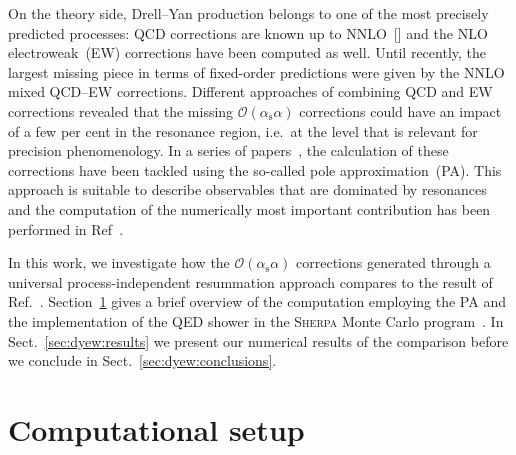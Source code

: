 \documentclass[11pt]{cernrep}
\newcommand{\order}{\ensuremath{\mathcal{O}}}
\newcommand{\alphas}{\ensuremath{\alpha_\mathrm{s}}}
\begin{document}
On the theory side, Drell--Yan production belongs to one of the most precisely predicted processes:
QCD corrections are known up to NNLO~[] and the NLO electroweak~(EW) corrections have been computed as well.
Until recently, the largest missing piece in terms of fixed-order predictions were given by the NNLO mixed QCD--EW corrections.
Different approaches of combining QCD and EW corrections revealed that the missing $\order(\alphas\alpha)$ corrections could have an impact of a few per cent in the resonance region, i.e.\ at the level that is relevant for precision phenomenology.
In a series of papers~\cite{Dittmaier:2014qza,Dittmaier:2015rxo}, the calculation of these corrections have been tackled using the so-called pole approximation~(PA).
This approach is suitable to describe observables that are dominated by resonances
and the computation of the numerically most important contribution has been performed in Ref~\cite{Dittmaier:2015rxo}.

In this work, we investigate how the $\order(\alphas\alpha)$ corrections 
generated through a universal process-independent resummation approach 
compares to the result of Ref.~\cite{Dittmaier:2015rxo}.
Section~\ref{sec:dyew:comp} gives a brief overview of the computation 
employing the PA and the implementation of the QED shower in the 
\textsc{Sherpa} Monte Carlo program~\cite{Gleisberg:2008ta}.
In Sect.~\ref{sec:dyew:results} we present our numerical results of the 
comparison before we conclude in Sect.~\ref{sec:dyew:conclusions}.


\section{Computational setup}
\label{sec:dyew:comp}

\end{document}
